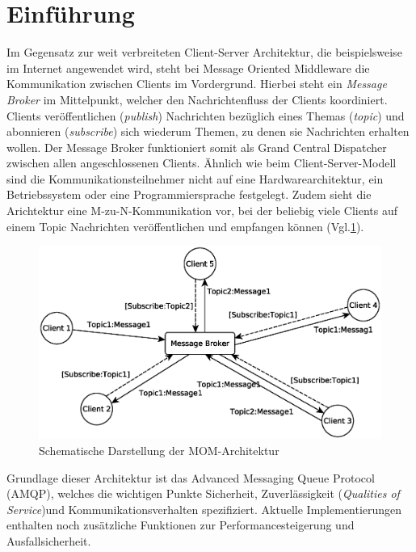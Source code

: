 \documentclass[conference, ngerman]{IEEEtran}
\begin{document}
\section{Einführung}

Im Gegensatz zur weit verbreiteten Client-Server Architektur, die beispielsweise im Internet angewendet wird, steht bei Message Oriented Middleware die Kommunikation zwischen Clients im Vordergrund. Hierbei steht ein \textit{Message Broker} im Mittelpunkt, welcher den Nachrichtenfluss der Clients koordiniert. Clients veröffentlichen (\textit{publish}) Nachrichten bezüglich eines Themas (\textit{topic}) und abonnieren (\textit{subscribe}) sich wiederum Themen, zu denen sie Nachrichten erhalten wollen\cite{wiki:PubSubAMQ}. Der Message Broker funktioniert somit als Grand Central Dispatcher zwischen allen angeschlossenen Clients. Ähnlich wie beim Client-Server-Modell sind die Kommunikationsteilnehmer nicht auf eine Hardwarearchitektur, ein Betriebssystem oder eine Programmiersprache festgelegt. Zudem sieht die Arichtektur eine M-zu-N-Kommunikation vor, bei der beliebig viele Clients auf einem Topic Nachrichten veröffentlichen und empfangen können (Vgl.\ref{fig:MOM_BILD}).

\begin{figure}[h]
\centering
\includegraphics[width=0.95\linewidth]{MOM_BILD}
\caption{Schematische Darstellung der MOM-Architektur}
\label{fig:MOM_BILD}
\end{figure}


 Grundlage dieser Architektur ist das Advanced Messaging Queue Protocol (AMQP)\cite{wiki:AMQP}, welches die wichtigen Punkte Sicherheit, Zuverlässigkeit (\textit{Qualities of Service})und Kommunikationsverhalten spezifiziert. Aktuelle Implementierungen enthalten noch zusätzliche Funktionen zur Performancesteigerung und Ausfallsicherheit.
\end{document}
